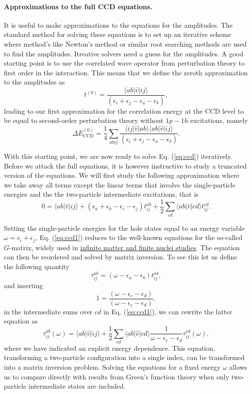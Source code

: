 \paragraph{Approximations to the full CCD equations.}
It is useful to make approximations to the equations for the amplitudes. The standard method for solving these equations is to set up an iterative scheme where method's like Newton's method or similar root searching methods are used to find the amplitudes. 
Itreative solvers need a guess for the amplitudes. A good starting point is to use the correlated wave operator from perturbation theory to
first order in the interaction.
This means that we define the zeroth approximation to the amplitudes as 
\[
t^{(0)}=\frac{\langle ab \vert \hat{v} \vert ij \rangle}{\left(\epsilon_i+\epsilon_j-\epsilon_a-\epsilon_b\right)},
\]
leading to our first approximation for the correlation energy at the CCD level to be equal to second-order perturbation theory without $1p-1h$ excitations, namely
\[
\Delta E_{\mathrm{CCD}}^{(0)}=\frac{1}{4}\sum_{abij} \frac{\langle ij \vert \hat{v} \vert ab \rangle \langle ab \vert \hat{v} \vert ij \rangle}{\left(\epsilon_i+\epsilon_j-\epsilon_a-\epsilon_b\right)}.
\]

With this starting point, we are now ready to solve Eq. (\ref{eq:ccd}) iteratively. Before we attack the full equations, it is however instructive to study a truncated version of the equations. We will first study the following approximation where we take away all terms except the linear terms that involve the single-particle energies and the the two-particle intermediate excitations, that is
\begin{equation}
0 = \langle ab \vert \hat{v} \vert ij \rangle + \left(\epsilon_a+\epsilon_b-\epsilon_i-\epsilon_j\right)t_{ij}^{ab}+\frac{1}{2}\sum_{cd} \langle ab \vert \hat{v} \vert cd \rangle t_{ij}^{cd}.
\label{eq:ccd1}
\end{equation}

Setting the single-particle energies for the hole states equal to an energy variable $\omega = \epsilon_i+\epsilon_j$, Eq. (\ref{eq:ccd1}) reduces to the
well-known equations for the so-called $G$-matrix, widely used in \href{{http://www.sciencedirect.com/science/journal/03701573/261/3-4}}{infinite matter and finite nuclei studies}. The equation can then be reordered and solved by matrix inversion.  To see this let us define the following quantity
\[
\tau_{ij}^{ab}= \left(\omega-\epsilon_a-\epsilon_b\right)t_{ij}^{ab},
\]
and inserting 
\[
1=\frac{\left(\omega-\epsilon_c-\epsilon_d\right)}{\left(\omega-\epsilon_c-\epsilon_d\right)},
\]
in the intermediate sums over $cd$ in Eq. (\ref{eq:ccd1}), we can rewrite the latter equation as
\[
\tau_{ij}^{ab}(\omega)= \langle ab \vert \hat{v} \vert ij \rangle + \frac{1}{2}\sum_{cd} \langle ab \vert \hat{v} \vert cd \rangle \frac{1}{\omega-\epsilon_c-\epsilon_d}\tau_{ij}^{cd}(\omega),
\]
where we have indicated an explicit energy dependence. This equation, transforming a two-particle configuration into a single index, can be transformed into a matrix inversion problem.  Solving the equations for a fixed energy $\omega$ allows us to compare directly with results from Green's function theory when only two-particle intermediate states are included. 


